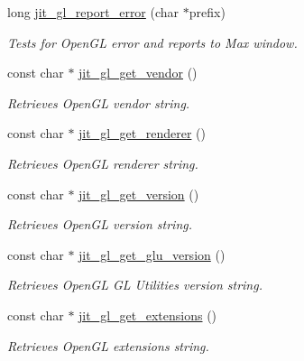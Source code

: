 \begin{DoxyCompactItemize}
\item 
long \hyperlink{group__ob3dmod_gad8a6b7497c6c377d4ab1a740d9abbc26}{jit\_\-gl\_\-report\_\-error} (char $\ast$prefix)
\begin{DoxyCompactList}\small\item\em Tests for OpenGL error and reports to Max window. \item\end{DoxyCompactList}\item 
const char $\ast$ \hyperlink{group__ob3dmod_gafb99f462a0bd84c178284a8729facbc8}{jit\_\-gl\_\-get\_\-vendor} ()
\begin{DoxyCompactList}\small\item\em Retrieves OpenGL vendor string. \item\end{DoxyCompactList}\item 
const char $\ast$ \hyperlink{group__ob3dmod_ga0a828499dc5e04fa6cbaaa0dce08ad16}{jit\_\-gl\_\-get\_\-renderer} ()
\begin{DoxyCompactList}\small\item\em Retrieves OpenGL renderer string. \item\end{DoxyCompactList}\item 
const char $\ast$ \hyperlink{group__ob3dmod_gae2015d77352f442de5f37b6f6e56ac25}{jit\_\-gl\_\-get\_\-version} ()
\begin{DoxyCompactList}\small\item\em Retrieves OpenGL version string. \item\end{DoxyCompactList}\item 
const char $\ast$ \hyperlink{group__ob3dmod_ga62580f14c9103c4433d4a6811c1cc364}{jit\_\-gl\_\-get\_\-glu\_\-version} ()
\begin{DoxyCompactList}\small\item\em Retrieves OpenGL GL Utilities version string. \item\end{DoxyCompactList}\item 
const char $\ast$ \hyperlink{group__ob3dmod_gaae341db507889b8c5bf5a6e0d6f9e03f}{jit\_\-gl\_\-get\_\-extensions} ()
\begin{DoxyCompactList}\small\item\em Retrieves OpenGL extensions string. \item\end{DoxyCompactList}\item 

\end{DoxyCompactItemize}
